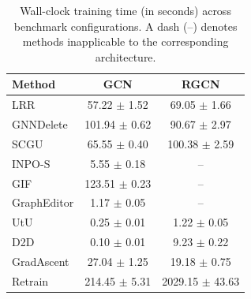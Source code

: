 \begin{table}

\centering

\fontsize{7.3}{8.7}\selectfont

\caption{Wall-clock training time (in seconds) across benchmark configurations. A dash (--) denotes methods inapplicable to the corresponding architecture.}\label{tab:runtime}

\setlength{\tabcolsep}{3pt}

\begin{tabular*}{\columnwidth}{@{\extracolsep{\fill}}lcc}

\toprule

Method & GCN & RGCN \\

\midrule

LRR & 57.22 $\pm$ 1.52 & 69.05 $\pm$ 1.66 \\

GNNDelete & 101.94 $\pm$ 0.62 & 90.67 $\pm$ 2.97 \\

SCGU & 65.55 $\pm$ 0.40 & 100.38 $\pm$ 2.59 \\

INPO-S & 5.55 $\pm$ 0.18 & -- \\

GIF & 123.51 $\pm$ 0.23 & -- \\

GraphEditor & 1.17 $\pm$ 0.05 & -- \\

UtU & 0.25 $\pm$ 0.01 & 1.22 $\pm$ 0.05 \\

D2D & 0.10 $\pm$ 0.01 & 9.23 $\pm$ 0.22 \\

GradAscent & 27.04 $\pm$ 1.25 & 19.18 $\pm$ 0.75 \\

Retrain & 214.45 $\pm$ 5.31 & 2029.15 $\pm$ 43.63 \\

\bottomrule

\end{tabular*}

\end{table}